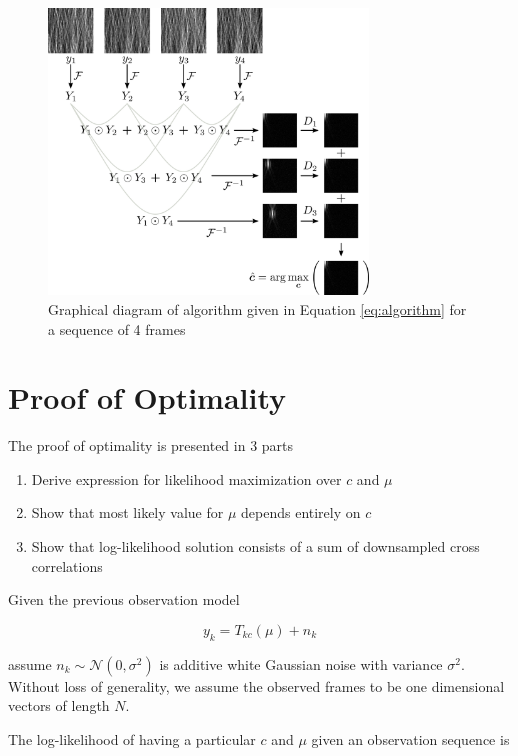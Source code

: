 \documentclass{article}
\begin{document}
\begin{figure}[htb]
  \begin{minipage}[b]{1\linewidth}
    \centering
    \centerline{\includegraphics[width=8.5cm]{images/algorithm.png}}
  \end{minipage}
  \caption{Graphical diagram of algorithm given in Equation \ref{eq:algorithm} for a sequence of 4 frames}
  \label{fig:algorithm}
\end{figure}

\section{Proof of Optimality}
\label{sec:optimality}

The proof of optimality is presented in 3 parts

\begin{enumerate}
\item Derive expression for likelihood maximization over $c$ and $\mu$
\item Show that most likely value for $\mu$ depends entirely on $c$
\item Show that log-likelihood solution consists of a sum of downsampled cross correlations
\end{enumerate}

Given the previous observation model

$$y_k = T_{kc}(\mu) + n_k$$

assume $n_k \sim \mathcal{N}(0, \sigma^2)$ is additive white Gaussian noise with variance $\sigma^2$.  Without loss of generality, we assume the observed frames to be one dimensional vectors of length $N$.

The log-likelihood of having a particular $c$ and $\mu$ given an observation sequence is
\end{document}
